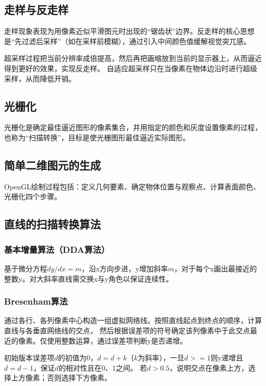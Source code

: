\documentclass[12pt]{article}
\begin{document}
\subsection{走样与反走样}

走样现象表现为用像素近似平滑图元时出现的“锯齿状”边界。反走样的核心思想是“先过滤后采样”（如在采样前模糊），通过引入中间颜色值缓解视觉突兀感。

超采样过程把当前分辨率成倍提高，然后再把画缩放到当前的显示器上，从而逼近得到更好的效果，实现反走样。
自适应超采样只在当像素在物体边沿时进行超级采样，从而降低开销。

\subsection{光栅化}

光栅化是确定最佳逼近图形的像素集合，并用指定的颜色和灰度设置像素的过程，也称为“扫描转换”，目标是使光栅图形最佳逼近实际图形。

\subsection{简单二维图元的生成}

OpenGL绘制过程包括：定义几何要素、确定物体位置与观察点、计算表面颜色、光栅化四个步骤。

\subsection{直线的扫描转换算法}

\subsubsection{基本增量算法（DDA算法）}
基于微分方程$dy/dx = m$，沿x方向步进，y增加斜率$m$，对于每个x画出最接近的整数y。对大斜率直线需交换x与y角色以保证连续性。

\subsubsection{Bresenham算法}
通过各行、各列像素中心构造一组虚拟网络线。按照直线起点到终点的顺序，计算直线与各垂直网络线的交点，
然后根据误差项的符号确定该列像素中于此交点最近的像素。仅使用整数运算，通过误差项判断y是否递增。

初始版本误差项$d$的初值为0，$d = d + k$（$k$为斜率），一旦$d >= 1$则y递增且$d = d - 1$，保证$d$的相对性且在0、1之间。
若$d > 0.5$，说明交点在像素上方，选择上方像素；否则选择下方像素。
\end{document}
